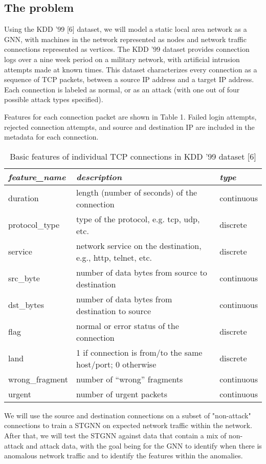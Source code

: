 \documentclass{article}
\begin{document}
\subsection{The problem}

Using the KDD '99 [6] dataset, we will model a static local area network as a GNN, with machines in the network represented as nodes and network traffic connections represented as vertices. The KDD '99 dataset provides connection logs over a nine week period on a military network, with artificial intrusion attempts made at known times. This dataset characterizes every connection as a sequence of TCP packets, between a source IP address and a target IP address. Each connection is labeled as normal, or as an attack (with one out of four possible attack types specified). 

Features for each connection packet are shown in Table 1. Failed login attempts, rejected connection attempts, and source and destination IP are included in the metadata for each connection.

\begin{table}[]
\begin{tabular}{|l|l|l|}
\hline
\textit{feature\_name} & \textit{description} & \textit{type} \\ \hline
duration & length (number of seconds) of the connection & continuous \\
protocol\_type & type of the protocol, e.g. tcp, udp, etc. & discrete \\
service & network service on the destination, e.g., http, telnet, etc. & discrete \\
src\_byte & number of data bytes from source to destination & continuous \\
dst\_bytes & number of data bytes from destination to source & continuous \\
flag & normal or error status of the connection & discrete \\
land & 1 if connection is from/to the same host/port; 0 otherwise & discrete \\
wrong\_fragment & number of ``wrong'' fragments & continuous \\
urgent & number of urgent packets & continuous \\ \hline
\end{tabular}
\caption{Basic features of individual TCP connections in KDD '99 dataset [6]}
\end{table}


We will use the source and destination connections on a subset of "non-attack" connections to train a STGNN on expected network traffic within the network. After that, we will test the STGNN against data that contain a mix of non-attack and attack data, with the goal being for the GNN to identify when there is anomalous network traffic and to identify the features within the anomalies. 
\end{document}
